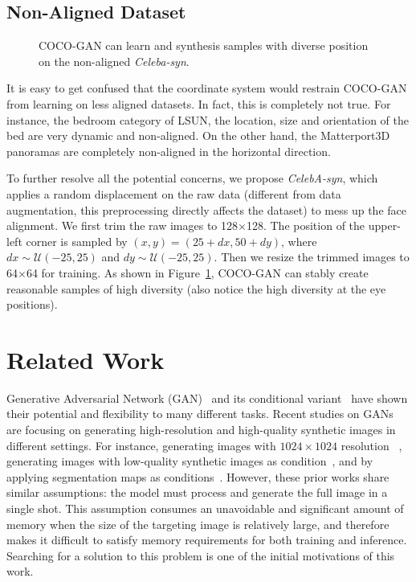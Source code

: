 \documentclass{article}
\begin{document}
    \subsection{Non-Aligned Dataset}
    
        \begin{figure}[t]
            \centering
            \vspace{-1.5em}
            \caption{COCO-GAN can learn and synthesis samples with diverse position on the non-aligned \textit{Celeba-syn}.}
            \label{fig:celeba-syn}
            \vspace{-1.5em}
        \end{figure}
    
        It is easy to get confused that the coordinate system would restrain COCO-GAN from learning on less aligned datasets. In fact, this is completely not true. For instance, the bedroom category of LSUN, the location, size and orientation of the bed are very dynamic and non-aligned. On the other hand, the Matterport3D panoramas are completely non-aligned in the horizontal direction. 
        
        To further resolve all the potential concerns, we propose \textit{CelebA-syn}, which applies a random displacement on the raw data (different from data augmentation, this preprocessing directly affects the dataset) to mess up the face alignment. We first trim the raw images to 128$\times$128. The position of the upper-left corner is sampled by $(x,y) = (25+dx, 50+dy)$, where $dx\sim\mathcal{U}(-25,25)$ and $dy\sim\mathcal{U}(-25,25)$. Then we resize the trimmed images to 64$\times$64 for training. As shown in Figure~\ref{fig:celeba-syn}, COCO-GAN can stably create reasonable samples of high diversity (also notice the high diversity at the eye positions).
         \section{Related Work}

    Generative Adversarial Network (GAN)~\cite{GANs} and its conditional variant~\cite{cGAN} have shown their potential and flexibility to many different tasks. Recent studies on GANs are focusing on generating high-resolution and high-quality synthetic images in different settings. For instance, generating images with $1024\times 1024$ resolution ~\cite{PGGAN,R1-regularizer}, generating images with low-quality synthetic images as condition~\cite{apple-eye}, and by applying segmentation maps as conditions~\cite{pix2pix-HD}. However, these prior works share similar assumptions: the model must process and generate the full image in a single shot. This assumption consumes an unavoidable and significant amount of memory when the size of the targeting image is relatively large, and therefore makes it difficult to satisfy memory requirements for both training and inference. Searching for a solution to this problem is one of the initial motivations of this work.
\end{document}
